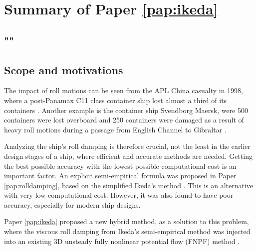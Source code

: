 \section{Summary of Paper \ref{pap:ikeda}}
\subsection*{""}
\subsection*{Scope and motivations}
The impact of roll motions can be seen from the APL China casualty in 1998, where a post-Panamax C11 class container ship lost almost a third of its containers \cite{franceInvestigationHeadSeaParametric2001}. Another example is the container ship Svendborg Maersk, were 500 containers were lost overboard and 250 containers were damaged as a result of heavy roll motions during a passage from English Channel to Gibraltar \cite{danishmaritimeaccidentinvestigationboardMarineAccidentReport2014}.

Analyzing the ship's roll damping is therefore crucial, not the least in the earlier design stages of a ship, where efficient and accurate methods are needed. 
Getting the best possible accuracy with the lowest possible computational cost is an important factor. An explicit semi-empirical formula was proposed in Paper \ref{pap:rolldamping}, based on the simplified Ikeda's method \cite{kawaharaSimplePredictionFormula2011}. This is an alternative with very low computational cost. However, it was also found to have poor accuracy, especially for modern ship designs. 

Paper \ref{pap:ikeda} proposed a new hybrid method, as a solution to this problem, where the viscous roll damping from Ikeda’s semi-empirical method was injected into an existing 3D unsteady fully nonlinear potential flow (FNPF) method \cite{kjellbergFullyNonlinearUnsteady2013}.

